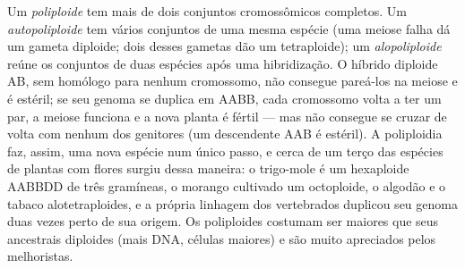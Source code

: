 \begin{definition}[Poliploidia]\label{def:b2:genome-diversification:polyploidy}
Um \emph{poliploide} tem mais de dois conjuntos cromossômicos
completos. Um \emph{autopoliploide} tem vários conjuntos de uma mesma
espécie (uma meiose falha dá um gameta diploide; dois desses gametas
dão um tetraploide); um \emph{alopoliploide} reúne os conjuntos de duas
espécies após uma hibridização. O híbrido diploide AB, sem homólogo
para nenhum cromossomo, não consegue pareá-los na meiose e é estéril;
se seu genoma se duplica em AABB, cada cromossomo volta a ter um par,
a meiose funciona e a nova planta é fértil --- mas não consegue se
cruzar de volta com nenhum dos genitores (um descendente AAB é
estéril). A poliploidia faz, assim, uma nova espécie num único passo,
e cerca de um terço das espécies de plantas com flores surgiu dessa
maneira: o trigo-mole é um hexaploide AABBDD de três gramíneas, o
morango cultivado um octoploide, o algodão e o tabaco alotetraploides,
e a própria linhagem dos vertebrados duplicou seu genoma duas vezes
perto de sua origem. Os poliploides costumam ser maiores que seus
ancestrais diploides (mais DNA, células maiores) e são muito
apreciados pelos melhoristas.
\end{definition}

